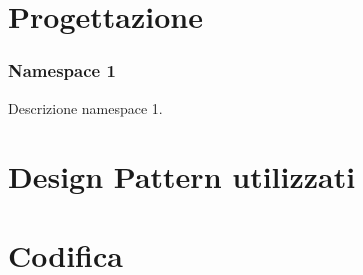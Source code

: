 \section{Progettazione}
\label{sec:progettazione}

\subsubsection{Namespace 1} %
Descrizione namespace 1.

\begin{namespacedesc}
\end{namespacedesc}


\section{Design Pattern utilizzati}

\section{Codifica}

